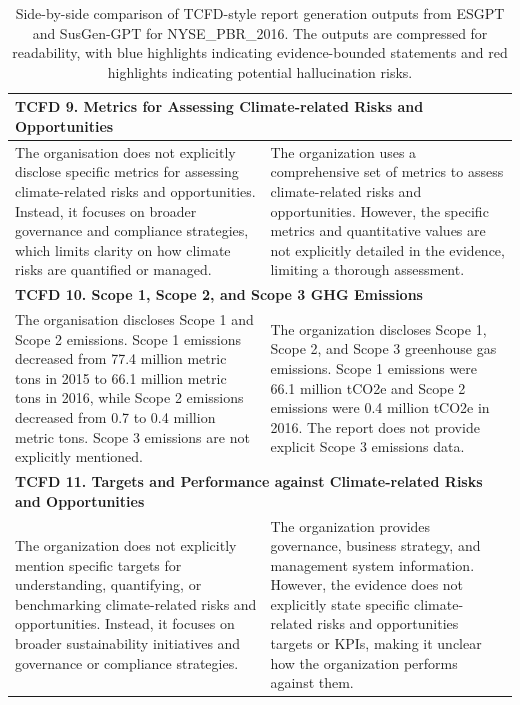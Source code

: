 \documentclass[11pt]{article}
\begin{document}
\begin{table}[t]
{\begin{tabular}{p{}|p{}}
\multicolumn{2}{l}{\textbf{TCFD 9. Metrics for Assessing Climate-related Risks and Opportunities}} \\
\hline
\textcolor{caseblue}{The organisation does not explicitly disclose specific metrics} for assessing climate-related risks and opportunities. 
Instead, it focuses on broader governance and compliance strategies, which limits clarity on how climate risks are quantified or managed.
&
The organization uses \textcolor{casered}{a comprehensive set of metrics} to assess climate-related risks and opportunities. 
However, \textcolor{casered}{the specific metrics and quantitative values are not explicitly detailed} in the evidence, limiting a thorough assessment.
\\
\hline

\multicolumn{2}{l}{\textbf{TCFD 10. Scope 1, Scope 2, and Scope 3 GHG Emissions}} \\
\hline
The organisation discloses Scope 1 and Scope 2 emissions. 
Scope 1 emissions decreased from 77.4 million metric tons in 2015 to 66.1 million metric tons in 2016, while Scope 2 emissions decreased from 0.7 to 0.4 million metric tons. 
\textcolor{caseblue}{Scope 3 emissions are not explicitly mentioned.}
&
The organization \textcolor{casered}{discloses Scope 1, Scope 2, and Scope 3 greenhouse gas emissions}. 
Scope 1 emissions were 66.1 million tCO2e and Scope 2 emissions were 0.4 million tCO2e in 2016. 
\textcolor{casered}{The report does not provide explicit Scope 3 emissions data.}
\\
\hline

\multicolumn{2}{l}{\textbf{TCFD 11. Targets and Performance against Climate-related Risks and Opportunities}} \\
\hline
\textcolor{caseblue}{The organization does not explicitly mention specific targets} for understanding, quantifying, or benchmarking climate-related risks and opportunities. 
Instead, it focuses on broader sustainability initiatives and governance or compliance strategies.
&
The organization provides governance, business strategy, and management system information. 
However, the evidence does not explicitly state specific climate-related risks and opportunities targets or KPIs, making it unclear how the organization performs against them.
\\
\hline

\end{tabular}%
}
\caption{Side-by-side comparison of TCFD-style report generation outputs from \textsf{ESGPT} and SusGen-GPT for NYSE\_PBR\_2016. The outputs are compressed for readability, with blue highlights indicating evidence-bounded statements and red highlights indicating potential hallucination risks.}
\label{tab:pbr_side_by_side_report}
\end{table}
\end{document}

